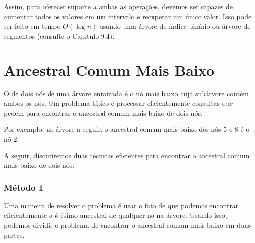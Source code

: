 Assim, para oferecer suporte a ambas as operações, devemos ser capazes de aumentar todos os valores em um intervalo e recuperar um único valor. Isso pode ser feito em tempo $O(\log n)$ usando uma árvore de índice binário ou árvore de segmentos (consulte o Capítulo 9.4).

\section{Ancestral Comum Mais Baixo}


O  de dois nós de uma árvore enraizada é o nó mais baixo cuja subárvore contém ambos os nós. Um problema típico é processar eficientemente consultas que pedem para encontrar o ancestral comum mais baixo de dois nós.

Por exemplo, na árvore a seguir, o ancestral comum mais baixo dos nós 5 e 8 é o nó 2:

\begin{center}
\end{center}

A seguir, discutiremos duas técnicas eficientes para encontrar o ancestral comum mais baixo de dois nós.

\subsubsection{Método 1}

Uma maneira de resolver o problema é usar o fato de que podemos encontrar eficientemente o $k$-ésimo ancestral de qualquer nó na árvore. Usando isso, podemos dividir o problema de encontrar o ancestral comum mais baixo em duas partes.

